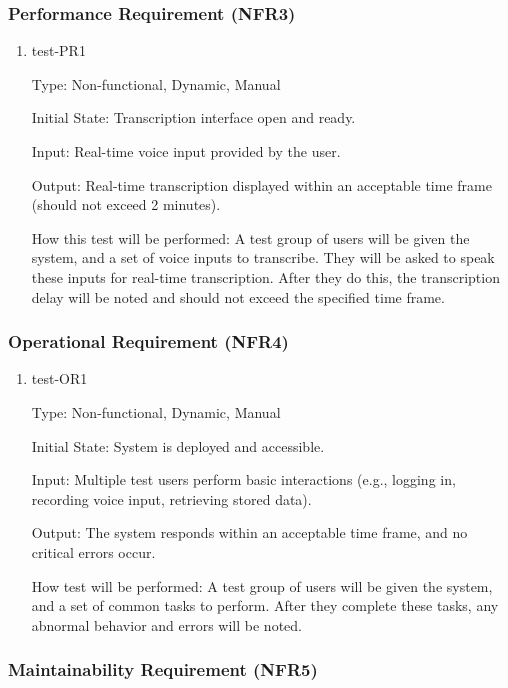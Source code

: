 \documentclass[12pt, titlepage]{article}
\begin{document}
\subsubsection{Performance Requirement (NFR3)} \label{section:4.2.3}

\begin{enumerate}
    \item{test-PR1} \label{test-PR1}
    
    Type: Non-functional, Dynamic, Manual
    
    Initial State: Transcription interface open and ready.
    
    Input: Real-time voice input provided by the user.
    
    Output: Real-time transcription displayed within an acceptable time frame (should not exceed 2 minutes).
    
    How this test will be performed: A test group of users will be given the system, and a set of voice inputs to transcribe. They will be asked to speak these inputs for real-time transcription. After they do this, the transcription delay will be noted and should not exceed the specified time frame.

\end{enumerate}

\subsubsection{Operational Requirement (NFR4)} \label{section:4.2.4}

\begin{enumerate}
    \item{test-OR1} \label{test-OR1}
    
    Type: Non-functional, Dynamic, Manual
    
    Initial State: System is deployed and accessible.
    
    Input: Multiple test users perform basic interactions (e.g., logging in, recording voice input, retrieving stored data).
    
    Output: The system responds within an acceptable time frame, and no critical errors occur.
    
    How test will be performed: A test group of users will be given the system, and a set of common tasks to perform. After they complete these tasks, any abnormal behavior and errors will be noted.
\end{enumerate}

\subsubsection{Maintainability Requirement (NFR5)} \label{section:4.2.5}
\end{document}
